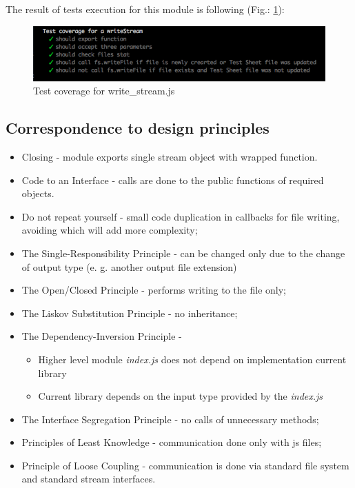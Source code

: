 The result of tests execution  for this module is following (Fig.: \ref{fig:testWrite}): 
\begin{figure}[H]
	\centering
	\includegraphics[width=\linewidth]{grafiken/testWriteStream.png}
	\caption{Test coverage for write\_stream.js}
	\label{fig:testWrite}
\end{figure}

\subsection{Correspondence to design principles}
\begin{itemize}
	\item Closing - module exports single stream object with wrapped function.
	\item Code to an Interface - calls are done to the public functions of required objects. 
	\item Do not repeat yourself - small code duplication in callbacks for file writing, avoiding which will add more complexity;
	\item The Single-Responsibility Principle - can be changed only due to the change of output type (e. g. another output file extension)
	\item The Open/Closed Principle - performs writing to the file only;
	\item The Liskov Substitution Principle - no inheritance;
	\item The Dependency-Inversion Principle - 
	\begin{itemize}
		\item Higher level module \textit{index.js} does not depend on implementation current library
		\item Current library depends on the input type provided by the \textit{index.js}
	\end{itemize}
	\item The Interface Segregation Principle - no calls of unnecessary methods;
	\item Principles of Least Knowledge - communication done only with js files;
	\item Principle of Loose Coupling - communication is done via standard file system and standard stream interfaces.
\end{itemize}

